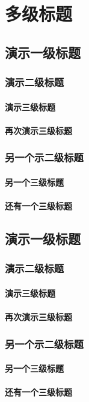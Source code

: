 
\chapter{多级标题}

\section{演示一级标题}
\subsection{演示二级标题}
\subsubsection{演示三级标题}
\subsubsection{再次演示三级标题}
\subsection{另一个示二级标题}
\subsubsection{另一个三级标题}
\subsubsection{还有一个三级标题}

\section{演示一级标题}
\subsection{演示二级标题}
\subsubsection{演示三级标题}
\subsubsection{再次演示三级标题}
\subsection{另一个示二级标题}
\subsubsection{另一个三级标题}
\subsubsection{还有一个三级标题}


